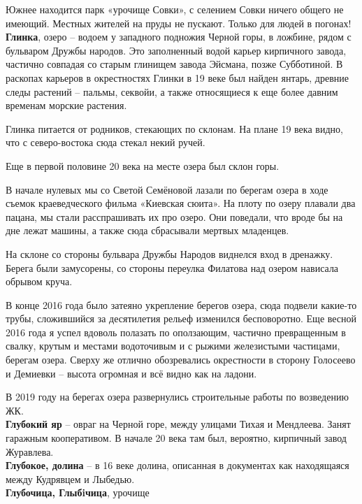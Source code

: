 Южнее находится парк «урочище Совки», с селением Совки ничего общего не имеющий. Местных жителей на пруды не пускают. Только для людей в погонах!\\

\textbf{Глинка}, озеро – водоем у западного подножия Черной горы, в ложбине, рядом с бульваром Дружбы народов. Это заполненный водой карьер кирпичного завода, частично совпадая со старым глинищем завода Эйсмана, позже Субботиной. В раскопах карьеров в окрестностях Глинки в 19 веке был найден янтарь, древние следы растений – пальмы, секвойи, а также относящиеся к еще более давним временам морские растения. 

Глинка питается от родников, стекающих по склонам. На плане 19 века видно, что с северо-востока сюда стекал некий ручей.

Еще в первой половине 20 века на месте озера был склон горы.

В начале нулевых мы со Светой Семёновой лазали по берегам озера в ходе съемок краеведческого фильма «Киевская сюита». На плоту по озеру плавали два пацана, мы стали расспрашивать их про озеро. Они поведали, что вроде бы на дне лежат машины, а также сюда сбрасывали мертвых младенцев.

На склоне со стороны бульвара Дружбы Народов виднелся вход в дренажку. Берега были замусорены, со стороны переулка Филатова над озером нависала обрывом круча.

В конце 2016 года было затеяно укрепление берегов озера, сюда подвели какие-то трубы, сложившийся за десятилетия рельеф изменился бесповоротно. Еще весной 2016 года я успел вдоволь полазать по оползающим, частично превращенным в свалку, крутым и местами водоточивым и с рыжими железистыми частицами, берегам озера. Сверху же отлично обозревались окрестности в сторону Голосеево и Демиевки – высота огромная и всё видно как на ладони.

В 2019 году на берегах озера развернулись строительные работы по возведению ЖК.\\

\textbf{Глубокий яр} – овраг на Черной горе, между улицами Тихая и Мендлеева. Занят гаражным кооперативом. В начале 20 века там был, вероятно, кирпичный завод Журавлева.\\

\textbf{Глубокое, долина} – в 16 веке долина, описанная в документах как находящаяся между Кудрявцем и Лыбедью.\\


\textbf{Глубочица, Глыбiчица}, урочище

